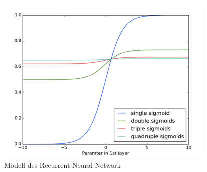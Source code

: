 \begin{figure}[h!]
	\centering
	\includegraphics[width=1\linewidth]{images/vanishing_gradient}
	\caption{Modell des Recurrent Neural Network \cite{deeplearning4j}} %
	\label{fig:topology}
\end{figure} 

